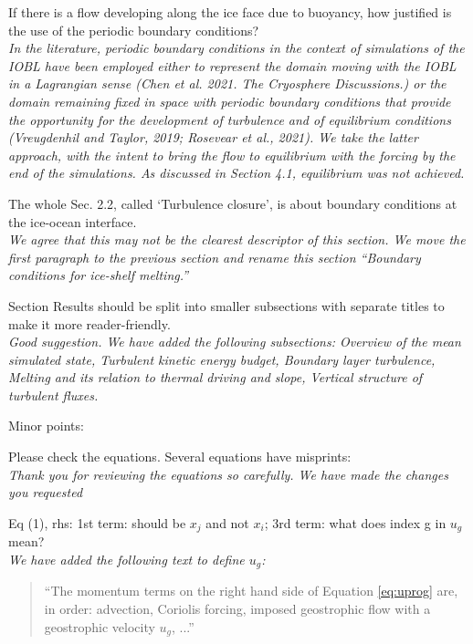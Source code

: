 \documentclass[tc, manuscript]{copernicus}
\begin{document}
If there is a flow developing along the ice face due to buoyancy, how justified is the use of the periodic boundary conditions?\\
\textit{In the literature, periodic boundary conditions in the context of simulations of the IOBL have been employed either to represent the domain moving with the IOBL in a Lagrangian sense (Chen et al. 2021. The Cryosphere Discussions.) or the domain remaining fixed in space with periodic boundary conditions that provide the opportunity for the development of turbulence and of equilibrium conditions (Vreugdenhil and Taylor, 2019; Rosevear et al., 2021). We take the latter approach, with the intent to bring the flow to equilibrium with the forcing by the end of the simulations. As discussed in Section 4.1, equilibrium was not achieved. }\vspace{12pt}

The whole Sec. 2.2, called ‘Turbulence closure’, is about boundary conditions at the ice-ocean interface.\\
\textit{We agree that this may not be the clearest descriptor of this section. We move the first paragraph to the previous section and rename this section ``Boundary conditions for ice-shelf melting.''}\vspace{12pt}

Section Results should be split into smaller subsections with separate titles to make it more reader-friendly.\\
\textit{Good suggestion. We have added the following subsections: Overview of the mean simulated state, Turbulent kinetic energy budget, Boundary layer turbulence, Melting and its relation to thermal driving and slope, Vertical structure of turbulent fluxes.}\vspace{12pt}


Minor points:\vspace{12pt}

Please check the equations. Several equations have misprints:\\
\textit{Thank you for reviewing the equations so carefully. We have made the changes you requested}\vspace{12pt}

Eq (1), rhs: 1st term: should be $x_j$ and not $x_i$; 3rd term: what does index g in $u_g$ mean?\\
\textit{We have added the following text to define $u_g$:}
\begin{quote}
``The momentum terms on the right hand side of Equation \ref{eq:uprog} are, in order: advection, Coriolis forcing, imposed geostrophic flow with a geostrophic velocity $u_g$, ...''
\end{quote}\vspace{12pt}
\end{document}
